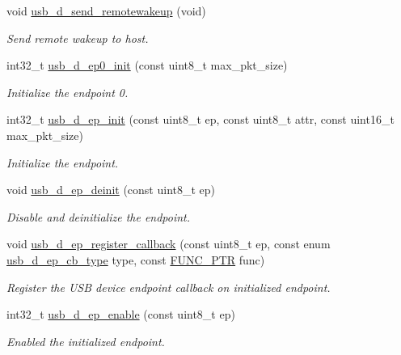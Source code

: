 \begin{DoxyCompactItemize}
void \hyperlink{group__doc__driver__hal__usb__device_ga8c17e7c142dc1439261904e3bcae4f0e}{usb\+\_\+d\+\_\+send\+\_\+remotewakeup} (void)
\begin{DoxyCompactList}\small\item\em Send remote wakeup to host. \end{DoxyCompactList}\item 
int32\+\_\+t \hyperlink{group__doc__driver__hal__usb__device_ga2afdd5d981af6ebb51653e7ab6d05e6b}{usb\+\_\+d\+\_\+ep0\+\_\+init} (const uint8\+\_\+t max\+\_\+pkt\+\_\+size)
\begin{DoxyCompactList}\small\item\em Initialize the endpoint 0. \end{DoxyCompactList}\item 
int32\+\_\+t \hyperlink{group__doc__driver__hal__usb__device_ga5146aa558c31f339e604b16763c81264}{usb\+\_\+d\+\_\+ep\+\_\+init} (const uint8\+\_\+t ep, const uint8\+\_\+t attr, const uint16\+\_\+t max\+\_\+pkt\+\_\+size)
\begin{DoxyCompactList}\small\item\em Initialize the endpoint. \end{DoxyCompactList}\item 
void \hyperlink{group__doc__driver__hal__usb__device_ga3e51e415f97d69a86d19f70774bbb4e5}{usb\+\_\+d\+\_\+ep\+\_\+deinit} (const uint8\+\_\+t ep)
\begin{DoxyCompactList}\small\item\em Disable and deinitialize the endpoint. \end{DoxyCompactList}\item 
void \hyperlink{group__doc__driver__hal__usb__device_gac044e514b0b7fb6a5e0ac8f61c6c1912}{usb\+\_\+d\+\_\+ep\+\_\+register\+\_\+callback} (const uint8\+\_\+t ep, const enum \hyperlink{hpl__usb__device_8h_a3853f69b4a009f20ffb6f8e117616865}{usb\+\_\+d\+\_\+ep\+\_\+cb\+\_\+type} type, const \hyperlink{group__doc__driver__hal__utils__macro_gae40b38bc5f5a5bd452bdd59c67d9a9cf}{F\+U\+N\+C\+\_\+\+P\+TR} func)
\begin{DoxyCompactList}\small\item\em Register the U\+SB device endpoint callback on initialized endpoint. \end{DoxyCompactList}\item 
int32\+\_\+t \hyperlink{group__doc__driver__hal__usb__device_ga1ad4a903a479d93cf1c44c51eeeb6621}{usb\+\_\+d\+\_\+ep\+\_\+enable} (const uint8\+\_\+t ep)
\begin{DoxyCompactList}\small\item\em Enabled the initialized endpoint. \end{DoxyCompactList}\item 

\end{DoxyCompactItemize}

